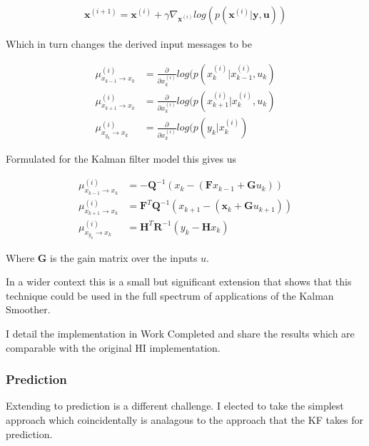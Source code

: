 \documentclass[]{../resources/final_report}
\begin{document}
\begin{align}
  \textbf{x}^{(i+1)} = \textbf{x}^{(i)} + \gamma \nabla_{\textbf{x}^{(i)}}log(p(\textbf{x}^{(i)} | \textbf{y}, \textbf{u}))
\end{align}


Which in turn changes the derived input messages to be 

\begin{align}
  \mu_{x_{k-1} \rightarrow x_k}^{(i)} &= \frac{\partial}{\partial x_k^{(i)}} log(p(x_k^{(i)}|x_{k-1}^{(i)}, u_{k})\\
  \mu_{x_{k+1} \rightarrow x_k}^{(i)} &= \frac{\partial}{\partial x_k^{(i)}} log(p(x_{k+1}^{(i)}|x_{k}^{(i)}, u_{k})\\
  \mu_{x_{y_k} \rightarrow x_k}^{(i)} &= \frac{\partial}{\partial x_k^{(i)}} log(p(y_{k}|x_{k}^{(i)})
\end{align}


Formulated for the Kalman filter model this gives us

\begin{align}
  \mu_{x_{k-1} \rightarrow x_k}^{(i)} &= -\textbf{Q}^{-1}(x_k - (\textbf{F}x_{k-1} +\textbf{G}u_k))\\
  \mu_{x_{k+1} \rightarrow x_k}^{(i)} &= \textbf{F}^T\textbf{Q}^{-1}(x_{k+1} - (\textbf{x}_k + \textbf{G}u_{k+1}))\\
  \mu_{x_{y_k} \rightarrow x_k}^{(i)} &= \textbf{H}^T\textbf{R}^{-1}(y_k - \textbf{H}x_k)
\end{align}

Where $\textbf{G}$ is the gain matrix over the inputs $u$.

In a wider context this is a small but significant extension that shows that this technique
could be used in the full spectrum of applications of the Kalman Smoother. 

I detail the implementation in Work Completed and share the results which are comparable 
with the original HI implementation.


\subsubsection{Prediction}

Extending to prediction is a different challenge. I elected to take the simplest approach
which coincidentally is analagous to the approach that the KF takes for prediction.
\end{document}
